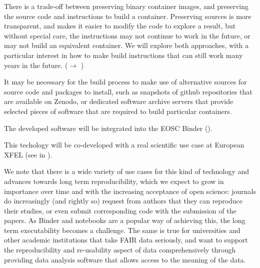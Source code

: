 \begin{task}[
  title=Archiving software environments for reproducible computation,
  id=reproducibility,
  lead=XFEL,
  PM=36,
  wphases={1-36},
  partners={XFEL,WTT,SRL,UPSUD,QS}
]
\begin{compactitem}
  There is a trade-off between preserving binary container images, and
  preserving the source code and instructions to build a container.
  Preserving sources is more transparent, and makes it easier to
  modify the code to explore a result, but without special care, the
  instructions may not continue to work in the future, or may not
  build an equivalent container.  We will explore both approaches,
  with a particular interest in how to make build instructions that
  can still work many years in the future.  ($\rightarrow$
  )

  It may be necessary for the build process to make use of alternative
  sources for source code and packages to install, such as snapshots
  of github repositories that are available on Zenodo, or dedicated
  software archive servers that provide selected pieces of software
  that are required to build particular containers.

  The developed software will be integrated into the EOSC Binder
  ().
  \end{compactitem}



This techology will be co-developed with a real scientific use case at
European XFEL (see  in
).

  We note that there is a wide variety of use cases for this kind of
  technology and advances towards long term reproducibility, which we
  expect to grow in importance over time and with the increasing
  acceptance of open science: journals do increasingly (and rightly
  so) request from authors that they can reproduce their studies, or
  even submit corresponding code with the submission of the papers. As
  Binder and notebooks are a popular way of achieving this, the long
  term executability becomes a challenge. The same is true for
  universities and other academic institutions that take FAIR data
  seriously, and want to support the reproducibility and re-usability
  aspect of data comprehensively through providing data analysis
  software that allows access to the meaning of the data.
\end{task}
